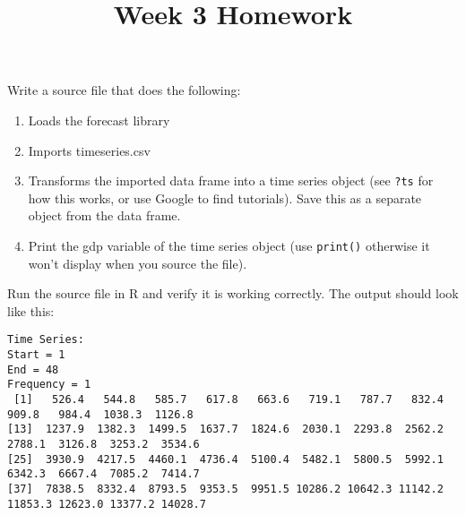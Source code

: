 \documentclass[12pt, oneside]{article}   	%
\title{Week 3 Homework}
\begin{document}
\maketitle

Write a source file that does the following:

\begin{enumerate}
\item Loads the forecast library
\item Imports timeseries.csv 
\item Transforms the imported data frame into a time series object (see \texttt{?ts} for how this works, or use Google to find tutorials). Save this as a separate object from the data frame.
\item Print the gdp variable of the time series object (use \texttt{print()} otherwise it won't display when you source the file).
\end{enumerate}

Run the source file in R and verify it is working correctly. The output should look like this:

\begin{verbatim}
Time Series:
Start = 1 
End = 48 
Frequency = 1 
 [1]   526.4   544.8   585.7   617.8   663.6   719.1   787.7   832.4   909.8   984.4  1038.3  1126.8
[13]  1237.9  1382.3  1499.5  1637.7  1824.6  2030.1  2293.8  2562.2  2788.1  3126.8  3253.2  3534.6
[25]  3930.9  4217.5  4460.1  4736.4  5100.4  5482.1  5800.5  5992.1  6342.3  6667.4  7085.2  7414.7
[37]  7838.5  8332.4  8793.5  9353.5  9951.5 10286.2 10642.3 11142.2 11853.3 12623.0 13377.2 14028.7
\end{verbatim}
\end{document}
